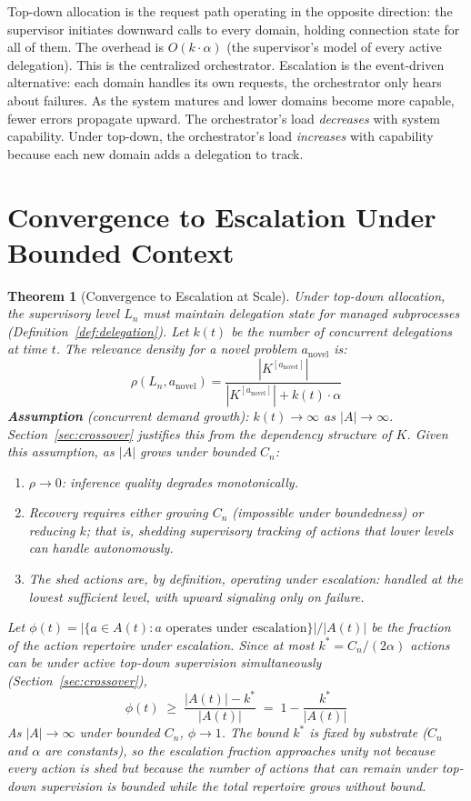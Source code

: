 \documentclass[11pt]{article}
\newtheorem{theorem}{Theorem}
\theoremstyle{definition}
\begin{document}
Top-down allocation is the request path operating in the opposite
direction: the supervisor initiates downward calls to every domain,
holding connection state for all of them. The overhead is $O(k \cdot
\alpha)$ (the supervisor's model of every active delegation). This is
the centralized orchestrator. Escalation is the event-driven
alternative: each domain handles its own requests, the orchestrator
only hears about failures. As the system matures and lower domains
become more capable, fewer errors propagate upward. The orchestrator's
load \emph{decreases} with system capability. Under top-down, the
orchestrator's load \emph{increases} with capability because each new
domain adds a delegation to track.

\section{Convergence to Escalation Under Bounded Context}
\label{sec:topdown}

\begin{theorem}[Convergence to Escalation at Scale]
\label{thm:topdown}
Under top-down allocation, the supervisory level $L_n$ must maintain
delegation state for managed subprocesses
(Definition~\ref{def:delegation}). Let $k(t)$ be the number of
concurrent delegations at time $t$. The relevance density for a novel
problem $a_{\mathrm{novel}}$ is:
\[
\rho(L_n, a_{\mathrm{novel}}) =
\frac{|K^{[a_{\mathrm{novel}}]}|}{|K^{[a_{\mathrm{novel}}]}| + k(t)
\cdot \alpha}
\]
\textbf{Assumption} (concurrent demand growth): $k(t) \to \infty$ as
$|A| \to \infty$. Section~\ref{sec:crossover} justifies this from the
dependency structure of $K$. Given this assumption, as $|A|$ grows
under bounded $C_n$:
\begin{enumerate}
\item[(i)] $\rho \to 0$: inference quality degrades monotonically.
\item[(ii)] Recovery requires either growing $C_n$ (impossible under
   boundedness) or reducing $k$; that is, shedding supervisory
   tracking of actions that lower levels can handle autonomously.
\item[(iii)] The shed actions are, by definition, operating under
   escalation: handled at the lowest sufficient level, with upward
   signaling only on failure.
\end{enumerate}
Let $\phi(t) = |\{a \in A(t) : a \text{ operates under escalation}\}|
/ |A(t)|$ be the fraction of the action repertoire under escalation.
Since at most $k^* = C_n / (2\alpha)$ actions can be under active
top-down supervision simultaneously (Section~\ref{sec:crossover}),
\[
\phi(t) \;\geq\; \frac{|A(t)| - k^*}{|A(t)|} \;=\; 1 - \frac{k^*}{|A(t)|}
\]
As $|A| \to \infty$ under bounded $C_n$, $\phi \to 1$. The bound
$k^*$ is fixed by substrate ($C_n$ and $\alpha$ are constants), so
the escalation fraction approaches unity not because every action is
shed but because the number of actions that \emph{can} remain under
top-down supervision is bounded while the total repertoire grows
without bound.
\end{theorem}
\end{document}
